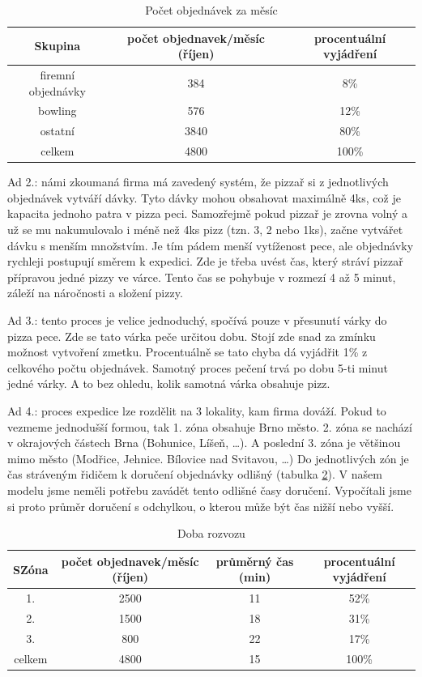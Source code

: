 \documentclass[a4paper, 12pt]{article}[9.12.2013]
\begin{document}
\begin{table}[h]
\centering
\begin{tabular}{ c | c | c }
    Skupina & počet objednavek/měsíc (říjen) & procentuální vyjádření\\
    \hline
    firemní objednávky & 384 & 8\%\\
    bowling	& 576 & 12\%\\
    ostatní	& 3840 & 80\%\\
    \hline
    celkem & 4800 & 100\%
\end{tabular}
\caption{Počet objednávek za měsíc}
\label {tab:objednavky}
\end{table}

Ad 2.: námi zkoumaná firma má zavedený systém, že pizzař si z jednotlivých
objednávek vytváří dávky. Tyto dávky mohou obsahovat maximálně 4ks, což je
kapacita jednoho patra v pizza peci. Samozřejmě pokud pizzař je zrovna volný a
už se mu nakumulovalo i méně než 4ks pizz (tzn. 3, 2 nebo 1ks), začne vytvářet
dávku s menším množstvím. Je tím pádem menší vytíženost pece, ale objednávky
rychleji postupují směrem k expedici. Zde je třeba uvést čas, který stráví
pizzař přípravou jedné pizzy ve várce. Tento čas se pohybuje v rozmezí 4 až 5
minut, záleží na náročnosti a složení pizzy.

Ad 3.: tento proces je velice jednoduchý, spočívá pouze v přesunutí várky do
pizza pece. Zde se tato várka peče určitou dobu. Stojí zde snad za zmínku
možnost vytvoření zmetku. Procentuálně se tato chyba dá vyjádřit 1\% z celkového
počtu objednávek.  Samotný proces pečení trvá po dobu 5-ti minut jedné várky. A
to bez ohledu, kolik samotná várka obsahuje pizz.

Ad 4.: proces expedice lze rozdělit na 3 lokality, kam firma dováží. Pokud to
vezmeme jednodušší formou, tak 1. zóna obsahuje Brno město. 2. zóna se nachází v
okrajových částech Brna (Bohunice, Líšeň, \dots). A poslední 3. zóna je většinou
mimo město (Modřice, Jehnice. Bílovice nad Svitavou, \dots) Do jednotlivých zón
je čas stráveným řidičem k doručení objednávky odlišný (tabulka \ref{tab:rozvoz}). V našem
modelu jsme neměli potřebu zavádět tento odlišné časy doručení. Vypočítali jsme
si proto průměr doručení s odchylkou, o kterou může být čas nižší nebo vyšší.

\begin{table}[h]
\centering
\begin{tabular}{ c | c | c | c}
    SZóna & počet objednavek/měsíc (říjen) & průměrný čas (min) & procentuální vyjádření\\
    \hline
    1. & 2500 & 11 & 52\%\\
    2. & 1500 & 18 & 31\%\\
    3. & 800 &  22 & 17\%\\
    \hline
    celkem & 4800 & 15 & 100\%
\end{tabular}
\caption{Doba rozvozu}
\label {tab:rozvoz}
\end{table}
\end{document}
